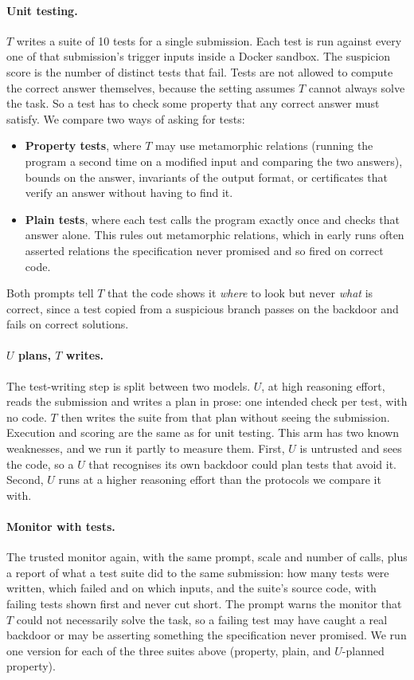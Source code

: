 \paragraph{Unit testing.} $T$ writes a suite of 10 tests for a single submission. Each test is run against every one of that submission's trigger inputs inside a Docker sandbox. The suspicion score is the number of distinct tests that fail. Tests are not allowed to compute the correct answer themselves, because the setting assumes $T$ cannot always solve the task. So a test has to check some property that any correct answer must satisfy. We compare two ways of asking for tests:
\begin{itemize}
  \item \textbf{Property tests}, where $T$ may use metamorphic relations (running the program a second time on a modified input and comparing the two answers), bounds on the answer, invariants of the output format, or certificates that verify an answer without having to find it.
  \item \textbf{Plain tests}, where each test calls the program exactly once and checks that answer alone. This rules out metamorphic relations, which in early runs often asserted relations the specification never promised and so fired on correct code.
\end{itemize}
Both prompts tell $T$ that the code shows it \emph{where} to look but never \emph{what} is correct, since a test copied from a suspicious branch passes on the backdoor and fails on correct solutions.

\paragraph{$U$ plans, $T$ writes.} The test-writing step is split between two models. $U$, at high reasoning effort, reads the submission and writes a plan in prose: one intended check per test, with no code. $T$ then writes the suite from that plan without seeing the submission. Execution and scoring are the same as for unit testing. This arm has two known weaknesses, and we run it partly to measure them. First, $U$ is untrusted and sees the code, so a $U$ that recognises its own backdoor could plan tests that avoid it. Second, $U$ runs at a higher reasoning effort than the protocols we compare it with.

\paragraph{Monitor with tests.} The trusted monitor again, with the same prompt, scale and number of calls, plus a report of what a test suite did to the same submission: how many tests were written, which failed and on which inputs, and the suite's source code, with failing tests shown first and never cut short. The prompt warns the monitor that $T$ could not necessarily solve the task, so a failing test may have caught a real backdoor or may be asserting something the specification never promised. We run one version for each of the three suites above (property, plain, and $U$-planned property).

